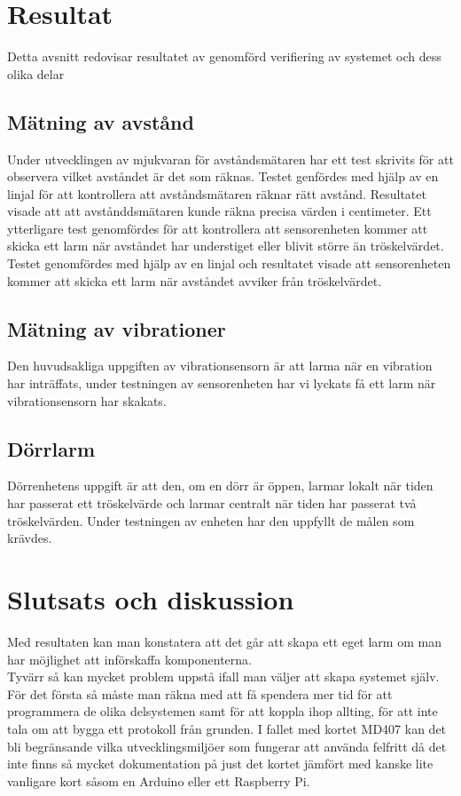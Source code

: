 \documentclass{article}
\begin{document}
\section{Resultat}
Detta avsnitt redovisar resultatet av genomförd verifiering av systemet och dess olika delar

\subsection{Mätning av avstånd}
Under utvecklingen av mjukvaran för avståndsmätaren har ett test skrivits för att observera vilket avståndet är det som räknas. Testet genfördes med hjälp av en linjal för att kontrollera att avståndsmätaren räknar rätt avstånd. Resultatet visade att att avstånddsmätaren kunde räkna precisa värden i centimeter. Ett ytterligare test genomfördes för att kontrollera att sensorenheten kommer att skicka ett larm när avståndet har understiget eller blivit större än tröskelvärdet. Testet genomfördes med hjälp av en linjal och resultatet visade att sensorenheten kommer att skicka ett larm när avståndet avviker från tröskelvärdet. 

\subsection{Mätning av vibrationer}
Den huvudsakliga uppgiften av vibrationsensorn är att larma när en vibration har inträffats, under testningen av sensorenheten har vi lyckats få ett larm när vibrationsensorn har skakats.


\subsection{Dörrlarm}
Dörrenhetens uppgift är att den, om en dörr är öppen, larmar lokalt när tiden har passerat ett tröskelvärde och larmar centralt när tiden har passerat två tröskelvärden. Under testningen av enheten har den uppfyllt de målen som krävdes.


\section{Slutsats och diskussion}
Med resultaten kan man konstatera att det går att skapa ett eget larm om man har möjlighet att införskaffa komponenterna.\\

Tyvärr så kan mycket problem uppstå ifall man väljer att skapa systemet själv.
För det första så måste man räkna med att få spendera mer tid för att programmera de olika delsystemen samt för att koppla ihop allting, för att inte tala om att bygga ett protokoll från grunden.
I fallet med kortet MD407 kan det bli begränsande vilka utvecklingsmiljöer som fungerar att använda felfritt då det inte finns så mycket dokumentation på just det kortet jämfört med kanske lite vanligare kort såsom en Arduino eller ett Raspberry Pi.\\
\end{document}
